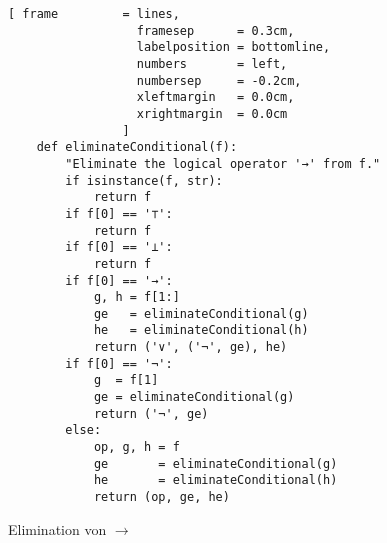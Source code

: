 \begin{figure}[!ht]
  \centering
\begin{Verbatim}[ frame         = lines, 
                  framesep      = 0.3cm, 
                  labelposition = bottomline,
                  numbers       = left,
                  numbersep     = -0.2cm,
                  xleftmargin   = 0.0cm,
                  xrightmargin  = 0.0cm
                ]
    def eliminateConditional(f):
        "Eliminate the logical operator '→' from f."
        if isinstance(f, str): 
            return f
        if f[0] == '⊤':
            return f
        if f[0] == '⊥':
            return f
        if f[0] == '→':
            g, h = f[1:]
            ge   = eliminateConditional(g)
            he   = eliminateConditional(h)
            return ('∨', ('¬', ge), he)
        if f[0] == '¬':
            g  = f[1]
            ge = eliminateConditional(g)
            return ('¬', ge)
        else:
            op, g, h = f
            ge       = eliminateConditional(g)
            he       = eliminateConditional(h)
            return (op, ge, he)
\end{Verbatim}
\vspace*{-0.3cm}
  \caption{Elimination von $\rightarrow$}
  \label{fig:eliminate-folgt}
\end{figure}
 
